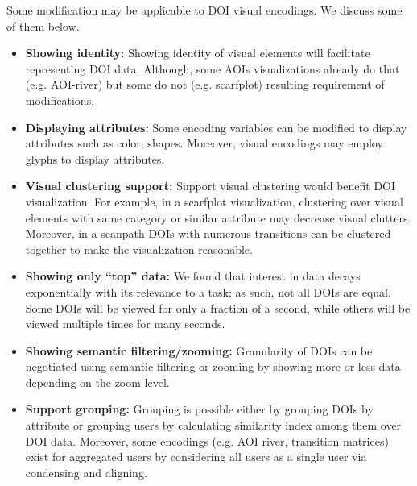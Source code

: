 Some modification may be applicable to DOI visual encodings. We discuss some of them below. 
\begin{itemize}
	\item \textbf{Showing identity:} Showing identity of visual elements will facilitate representing DOI data. Although, some AOIs visualizations already do that (e.g. AOI-river) but some do not (e.g. scarfplot) resulting requirement of modifications.
	\item \textbf{Displaying attributes:} Some encoding variables can be modified to display attributes such as color, shapes. Moreover, visual encodings may employ glyphs to display attributes.
	\item \textbf{Visual clustering support:} Support visual clustering would benefit DOI visualization. For example, in a scarfplot visualization, clustering over visual elements with same category or similar attribute may decrease visual clutters. Moreover, in a scanpath DOIs with numerous transitions can be clustered together to make the visualization reasonable. 
	\item \textbf{Showing only ``top'' data:} We found that interest in data decays exponentially with its relevance to a task; as such, not all DOIs are equal. Some DOIs will be viewed for only a fraction of a second, while others will be viewed multiple times for many seconds. 
	\item \textbf{Showing semantic filtering/zooming:} Granularity of DOIs can be negotiated using semantic filtering or zooming by showing more or less data depending on the zoom level.
	\item \textbf{Support grouping:} Grouping is possible either by grouping DOIs by attribute or grouping users by calculating similarity index among them over DOI data. Moreover, some encodings (e.g. AOI river, transition matrices) exist for aggregated users by considering all users as a single user via condensing and aligning. 
\end{itemize}


%
